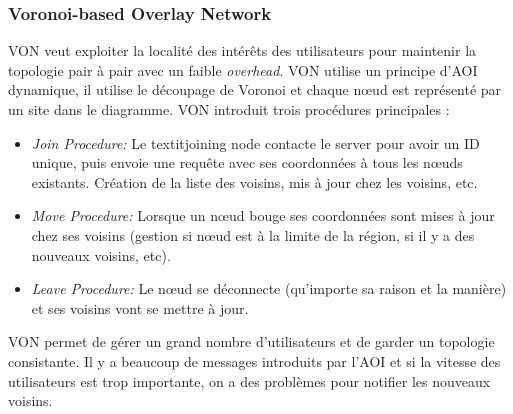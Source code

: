 		\subsubsection{Voronoi-based Overlay Network}
		 	VON veut exploiter la localité des intérêts des utilisateurs pour maintenir la topologie pair à pair avec un faible \textit{overhead}. VON utilise un principe d'AOI dynamique, il utilise le découpage de Voronoi et chaque nœud est représenté par un site dans le diagramme. VON introduit trois procédures principales :
		\begin{itemize}
	        \renewcommand{\labelitemi}{$\bullet$}
                	\item \textit{Join Procedure:} Le textit{joining node} contacte le server pour avoir un ID unique, puis envoie une requête avec ses coordonnées à tous les nœuds existants. Création de la liste des voisins, mis à jour chez les voisins, etc.
                	\item \textit{Move Procedure:} Lorsque un nœud bouge ses coordonnées sont mises à jour chez ses voisins (gestion si nœud est à la limite de la région, si il y a des nouveaux voisins, etc).
                	\item \textit{Leave Procedure:} Le nœud se déconnecte (qu'importe sa raison et la manière) et ses voisins vont se mettre à jour.
        	\end{itemize}
        	VON permet de gérer un grand nombre d'utilisateurs et de garder un topologie consistante. Il y a beaucoup de messages introduits par l'AOI et si la vitesse des utilisateurs est trop importante, on a des problèmes pour notifier les nouveaux voisins.

		

	
